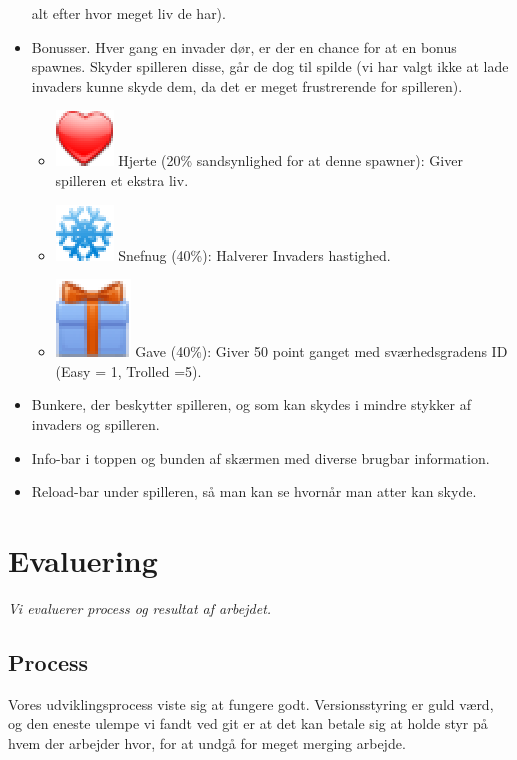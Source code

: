 \documentclass[titlepage,danish]{article}
\begin{document}
\begin{itemize}
  alt efter hvor meget liv de har).
\item Bonusser. Hver gang en invader dør, er der en chance for at en bonus spawnes. Skyder spilleren
  disse, går de dog til spilde (vi har valgt ikke at lade invaders kunne skyde dem, da det er meget
  frustrerende for spilleren).
  \begin{itemize}
  \item \includegraphics[scale=0.60]{heart.eps} Hjerte (20\% sandsynlighed for at denne spawner):
    Giver spilleren et ekstra liv.
  \item \includegraphics[scale=0.60]{snowFlake.eps} Snefnug (40\%): Halverer Invaders hastighed.
  \item \includegraphics[scale=0.60]{present2.eps} Gave (40\%): Giver 50 point ganget med
    sværhedsgradens ID (Easy = 1, Trolled =5).
  \end{itemize}
\item Bunkere, der beskytter spilleren, og som kan skydes i mindre stykker af invaders og spilleren.
\item Info-bar i toppen og bunden af skærmen med diverse brugbar information.
\item Reload-bar under spilleren, så man kan se hvornår man atter kan skyde.
\end{itemize}


\section{Evaluering}
\emph{Vi evaluerer process og resultat af arbejdet.}
\subsection{Process}
Vores udviklingsprocess viste sig at fungere godt. Versionsstyring er guld værd, og den eneste
ulempe vi fandt ved git er at det kan betale sig at holde styr på hvem der arbejder hvor, for at
undgå for meget merging arbejde.
\end{document}
